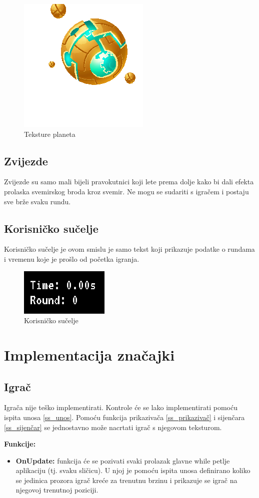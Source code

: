 \documentclass{mathos}
\begin{document}
\begin{figure}[H]
    \includegraphics[scale=0.5]{Slike/cyborg.png}
    \caption{Teksture planeta}
    \label{im_planeti}
\end{figure}

\subsection{Zvijezde}
Zvijezde su samo mali bijeli pravokutnici koji lete prema dolje kako bi dali efekta prolaska svemirskog broda kroz svemir. Ne mogu se sudariti s igračem i postaju sve brže svaku rundu.

\subsection{Korisničko sučelje}
Korisničko sučelje je ovom smislu je samo tekst koji prikazuje podatke o rundama i vremenu koje je prošlo od početka igranja.

\begin{figure}[H]
    \centering
    \includegraphics[scale=1.0]{Slike/UIGame.png}
    \caption{Korisničko sučelje}
    \label{im_suceljeGame}
\end{figure}

\section{Implementacija značajki}
\subsection{Igrač}
Igrača nije teško implementirati. Kontrole će se lako implementirati pomoću ispita unosa \ref{ss_unos}. Pomoću funkcija prikazivača \ref{ss_prikazivač} i sijenčara \ref{ss_sijenčar}
se jednostavno može nacrtati igrač s njegovom teksturom.

\textbf{Funkcije:}
\begin{itemize}
    \item \textbf{OnUpdate: } funkcija će se pozivati svaki prolazak glavne while petlje aplikaciju (tj. svaku sličicu). U njoj je pomoću ispita unosa definirano koliko se
          jedinica prozora igrač kreće za trenutnu brzinu i prikazuje se igrač na njegovoj trenutnoj poziciji.
\end{itemize}
\end{document}
